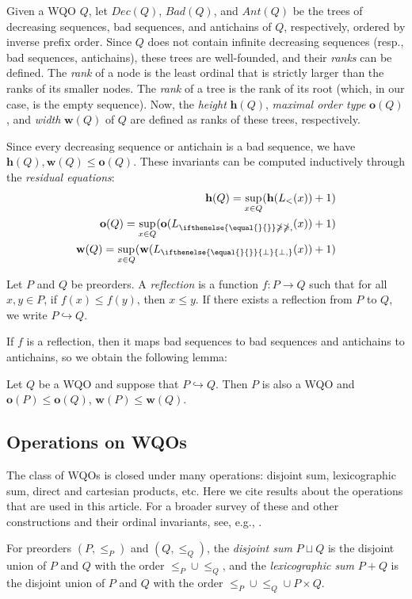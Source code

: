 \documentclass[runningheads]{llncs}
\let \leq \leqslant
\let \ngeq \ngeqslant
\let \embeds \hookrightarrow
\renewcommand \L [2][]{L_{\ifthenelse{\equal{#1}{}}\ngeq{\ngeq,#1}}(#2)}
\renewcommand \l [2][]{\o(\L[#1]{#2})}
\newcommand \K [2][]{L_{\ifthenelse{\equal{#1}{}}{\bot}{\bot,#1}}(#2)}
\renewcommand \k [2][]{\w(\K[#1]{#2})}
\def \h {\textbf{h}}
\def \o {\textbf{o}}
\def \w {\textbf{w}}
\begin{document}
Given a WQO $Q$, let $Dec(Q)$, $Bad(Q)$, and $Ant(Q)$ be the trees of decreasing sequences, bad sequences, and antichains of $Q$, respectively, ordered by inverse prefix order. Since $Q$ does not contain infinite decreasing sequences (resp., bad sequences, antichains), these trees are well-founded, and their \textit{ranks} can be defined. The \textit{rank} of a node is the least ordinal that is strictly larger than the ranks of its smaller nodes. The \textit{rank} of a tree is the rank of its root (which, in our case, is the empty sequence). Now, the \textit{height} $\h(Q)$, \textit{maximal order type} $\o(Q)$, and \textit{width} $\w(Q)$ of $Q$ are defined as ranks of these trees, respectively.

Since every decreasing sequence or antichain is a bad sequence, we have $\h(Q), \w(Q) \leq \o(Q)$. These invariants can be computed inductively through the \textit{residual equations}:
\begin{align*}
    \h(Q) = \sup_{x \in Q} (\h(L_<(x)) + 1)\\
    \o(Q) = \sup_{x \in Q} (\l{x} + 1)\\
    \w(Q) = \sup_{x \in Q} (\k{x} + 1)
\end{align*}

Let $P$ and $Q$ be preorders. A \textit{reflection} is a function $f \colon P \to Q$ such that for all $x, y \in P$, if $f(x) \leq f(y)$, then $x \leq y$. If there exists a reflection from $P$ to $Q$, we write $P \embeds Q$.

If $f$ is a reflection, then it maps bad sequences to bad sequences and antichains to antichains, so we obtain the following lemma:
\begin{lemma}\label{embedding}
    Let $Q$ be a WQO and suppose that $P \embeds Q$. Then $P$ is also a WQO and $\o(P) \leq \o(Q)$, $\w(P) \leq \w(Q)$.
\end{lemma}

\subsection{Operations on WQOs}

The class of WQOs is closed under many operations: disjoint sum, lexicographic sum, direct and cartesian products, etc. Here we cite results about the operations that are used in this article. For a broader survey of these and other constructions and their ordinal invariants, see, e.g., \cite{Dzamonja2020}.

For preorders $(P, \leq_P)$ and $(Q, \leq_Q)$, the \textit{disjoint sum} $P \sqcup Q$ is the disjoint union of $P$ and $Q$ with the order $\leq_P \cup \leq_Q$, and the \textit{lexicographic sum} $P + Q$ is the disjoint union of $P$ and $Q$ with the order $\leq_P \cup \leq_Q \cup P \times Q$.
\end{document}
